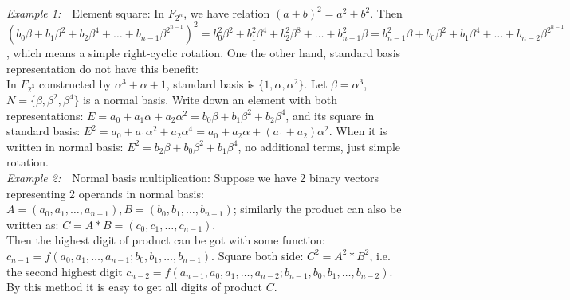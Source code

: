 \documentclass[conference]{IEEEtran}
\begin{document}
\textit{Example 1:}\ \ Element square: In $F_{2^n}$, we have relation $(a+b)^2 = a^2 + b^2$. Then 
$(b_0\beta + b_1\beta^2 + b_2\beta^4 + \dots + b_{n-1}\beta^{2^{n-1}})^2 = 
b_0^2\beta^2 + b_1^2\beta^4 + b_2^2\beta^8 + \dots + b_{n-1}^2\beta = 
b_{n-1}^2\beta + b_0\beta^2 + b_1\beta^4 + \dots + b_{n-2}\beta^{2^{n-1}}$, which means a simple right-cyclic rotation.
One the other hand, standard basis representation do not have this benefit:\\
In $F_{2^3}$ constructed by $\alpha^3 + \alpha + 1$, standard basis is $\{ 1, \alpha, \alpha^2\}$.
Let $\beta = \alpha^3$, $N = \{ \beta, \beta^2, \beta^4\}$ is a normal basis. Write down an element with both representations:
$E = a_0 + a_1\alpha + a_2\alpha^2 = b_0\beta + b_1\beta^2 + b_2\beta^4$, and its square in standard basis:
$E^2 = a_0 + a_1\alpha^2 + a_2\alpha^4 = a_0 + a_2\alpha + (a_1 + a_2)\alpha^2$. When it is written in normal basis:
$E^2 = b_2\beta + b_0\beta^2 + b_1\beta^4$, no additional terms, just simple rotation.\\

\textit{Example 2:}\ \ Normal basis multiplication: Suppose we have 2 binary vectors representing 2 operands in normal
basis: $A = (a_0, a_1, \dots, a_{n-1}), B = (b_0, b_1, \dots, b_{n-1})$; similarly the product can also be written
as: $C = A*B = (c_0, c_1, \dots, c_{n-1}).$\\
Then the highest digit of product can be got with some function: $c_{n-1} = f(a_0, a_1, \dots, a_{n-1}; b_0, b_1, 
\dots, b_{n-1})$. Square both side: $C^2 = A^2*B^2$, i.e. the second highest digit $c_{n-2} = f(a_{n-1}, a_0, a_1, 
\dots, a_{n-2}; b_{n-1}, b_0, b_1, \dots, b_{n-2}).$ By this method it is easy to get all digits of product $C$.\\
\end{document}
